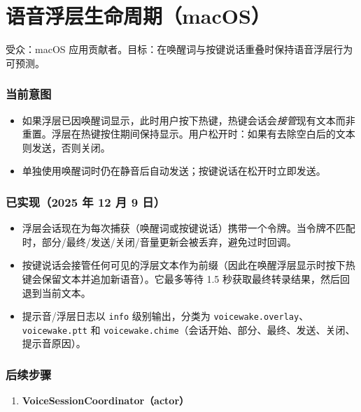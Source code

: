 \clearpage

\section{语音浮层生命周期（macOS）}


受众：macOS 应用贡献者。目标：在唤醒词与按键说话重叠时保持语音浮层行为可预测。

\subsubsection{当前意图}


\begin{itemize}
  \item 如果浮层已因唤醒词显示，此时用户按下热键，热键会话会\textit{接管}现有文本而非重置。浮层在热键按住期间保持显示。用户松开时：如果有去除空白后的文本则发送，否则关闭。
  \item 单独使用唤醒词时仍在静音后自动发送；按键说话在松开时立即发送。
\end{itemize}


\subsubsection{已实现（2025 年 12 月 9 日）}


\begin{itemize}
  \item 浮层会话现在为每次捕获（唤醒词或按键说话）携带一个令牌。当令牌不匹配时，部分/最终/发送/关闭/音量更新会被丢弃，避免过时回调。
  \item 按键说话会接管任何可见的浮层文本作为前缀（因此在唤醒浮层显示时按下热键会保留文本并追加新语音）。它最多等待 1.5 秒获取最终转录结果，然后回退到当前文本。
  \item 提示音/浮层日志以 \texttt{info} 级别输出，分类为 \texttt{voicewake.overlay}、\texttt{voicewake.ptt} 和 \texttt{voicewake.chime}（会话开始、部分、最终、发送、关闭、提示音原因）。
\end{itemize}


\subsubsection{后续步骤}


\begin{enumerate}
  \item \textbf{VoiceSessionCoordinator（actor）}
\end{enumerate}

